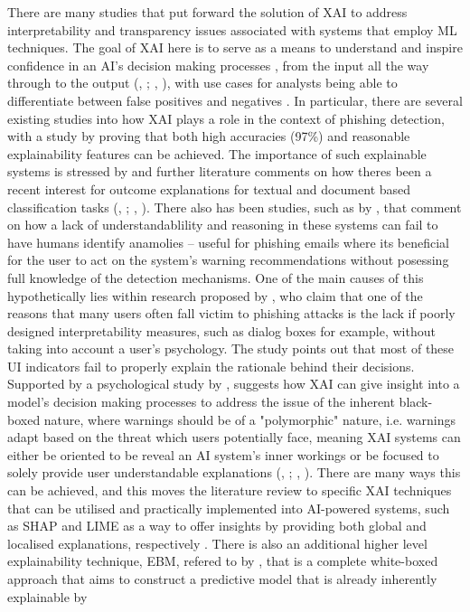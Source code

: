 There are many studies that put forward the solution of XAI to address interpretability and transparency issues \citep{roshan2022using} associated with systems that employ ML techniques. The goal of XAI here is to serve as a means to understand and inspire confidence in an AI's decision making processes \citep{khanom2025pd_ebm}, from the input all the way through to the output (\citeauthor{jawale2020jeevn}, \citeyear{jawale2020jeevn}; \citeauthor{sanchez2022phishing}, \citeyear{sanchez2022phishing}), with use cases for analysts being able to differentiate between false positives and negatives \citep{van2024applicability}. In particular, there are several existing studies into how XAI plays a role in the context of phishing detection, with a study by \cite{alzahrani2024explainable} proving that both high accuracies (97\%) and reasonable explainability features can be achieved. The importance of such explainable systems is stressed by \cite{shendkar2024enhancing} and further literature comments on how theres been a recent interest for outcome explanations for textual and document based classification tasks (\citeauthor{martens2014explaining}, \citeyear{martens2014explaining}; \citeauthor{lei2016rationalizing}, \citeyear{lei2016rationalizing}). There also has been studies, such as by \cite{vo2024securing}, that comment on how a lack of understandablility and reasoning in these systems can fail to have humans identify anamolies -- useful for phishing emails where its beneficial for the user to act on the system's warning recommendations without posessing full knowledge of the detection mechanisms. One of the main causes of this hypothetically lies within research proposed by \cite{greco2023explaining}, who claim that one of the reasons that many users often fall victim to phishing attacks is the lack if poorly designed interpretability measures, such as dialog boxes for example, without taking into account a user's psychology. The study points out that most of these UI indicators fail to properly explain the rationale behind their decisions. Supported by a psychological study by \cite{anderson2015polymorphic}, suggests how XAI can give insight into a model's decision making processes to address the issue of the inherent black-boxed nature, where warnings should be of a "polymorphic" nature, i.e. warnings adapt based on the threat which users potentially face, meaning XAI systems can either be oriented to be reveal an AI system's inner workings or be focused to solely provide user understandable explanations (\citeauthor{lipton2018mythos}, \citeyear{lipton2018mythos}; \citeauthor{ribeiro2016model}, \citeyear{ribeiro2016model}). There are many ways this can be achieved, and this moves the literature review to specific XAI techniques that can be utilised and practically implemented into AI-powered systems, such as SHAP and LIME as a way to offer insights \citep{shendkar2024enhancing} by providing both global and localised explanations, respectively \citep{palaniappan2020malicious}. There is also an additional higher level explainability technique, EBM, refered to by \cite{hernandes2021phishing}, that is a complete white-boxed approach that aims to construct a predictive model that is already inherently explainable by 